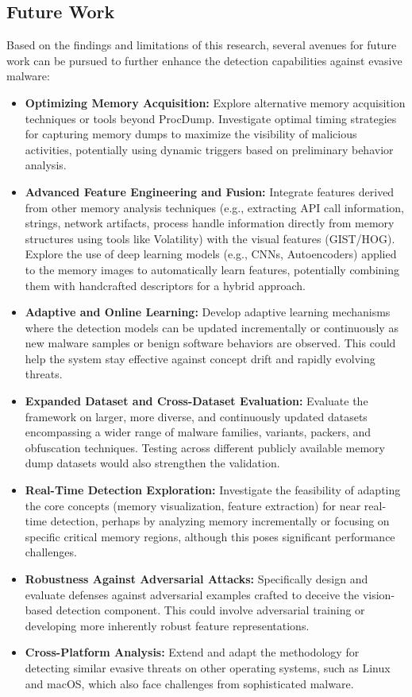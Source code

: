 \subsection{Future Work}
\label{subsec:future_work}

Based on the findings and limitations of this research, several avenues for future work can be pursued to further enhance the detection capabilities against evasive malware:

\begin{itemize}
    \item \textbf{Optimizing Memory Acquisition:} Explore alternative memory acquisition techniques or tools beyond ProcDump. Investigate optimal timing strategies for capturing memory dumps to maximize the visibility of malicious activities, potentially using dynamic triggers based on preliminary behavior analysis.
    \item \textbf{Advanced Feature Engineering and Fusion:} Integrate features derived from other memory analysis techniques (e.g., extracting API call information, strings, network artifacts, process handle information directly from memory structures using tools like Volatility) with the visual features (GIST/HOG). Explore the use of deep learning models (e.g., CNNs, Autoencoders) applied to the memory images to automatically learn features, potentially combining them with handcrafted descriptors for a hybrid approach.
    \item \textbf{Adaptive and Online Learning:} Develop adaptive learning mechanisms where the detection models can be updated incrementally or continuously as new malware samples or benign software behaviors are observed. This could help the system stay effective against concept drift and rapidly evolving threats.
    \item \textbf{Expanded Dataset and Cross-Dataset Evaluation:} Evaluate the framework on larger, more diverse, and continuously updated datasets encompassing a wider range of malware families, variants, packers, and obfuscation techniques. Testing across different publicly available memory dump datasets would also strengthen the validation.
    \item \textbf{Real-Time Detection Exploration:} Investigate the feasibility of adapting the core concepts (memory visualization, feature extraction) for near real-time detection, perhaps by analyzing memory incrementally or focusing on specific critical memory regions, although this poses significant performance challenges.
    \item \textbf{Robustness Against Adversarial Attacks:} Specifically design and evaluate defenses against adversarial examples crafted to deceive the vision-based detection component. This could involve adversarial training or developing more inherently robust feature representations.
    \item \textbf{Cross-Platform Analysis:} Extend and adapt the methodology for detecting similar evasive threats on other operating systems, such as Linux and macOS, which also face challenges from sophisticated malware.
\end{itemize}

